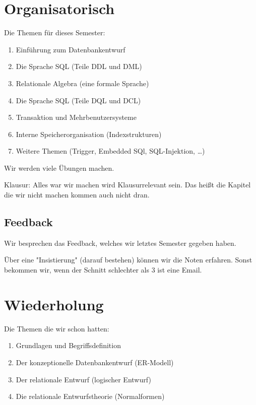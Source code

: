 \documentclass[a4paper]{article}
\title{\docTitle}
\author{Moritz}
\date{\today}
\begin{document}
\maketitle
\tableofcontents


\section{Organisatorisch}

Die Themen für dieses Semester:

\begin{enumerate}
    \item Einführung zum Datenbankentwurf
    \item Die Sprache SQL (Teile DDL und DML)
    \item Relationale Algebra (eine formale Sprache)
    \item Die Sprache SQL (Teile DQL und DCL)
    \item Transaktion und Mehrbenutzersysteme
    \item Interne Speicherorganisation (Indexstrukturen)
    \item Weitere Themen (Trigger, Embedded SQl, SQL-Injektion, \dots)
\end{enumerate}

Wir werden viele Übungen machen.

Klausur: Alles war wir machen wird Klausurrelevant sein. Das heißt die Kapitel die wir nicht machen kommen auch nicht dran.

\subsection{Feedback}

Wir besprechen das Feedback, welches wir letztes Semester gegeben haben.

Über eine "Insistierung" (darauf bestehen) können wir die Noten erfahren. Sonst bekommen wir, wenn der Schnitt schlechter als 3 ist eine Email.

\section{Wiederholung}

Die Themen die wir schon hatten:

\begin{enumerate}
    \item Grundlagen und Begriffsdefinition
    \item Der konzeptionelle Datenbankentwurf (ER-Modell)
    \item Der relationale Entwurf (logischer Entwurf)
    \item Die relationale Entwurfstheorie (Normalformen)
\end{enumerate}
\end{document}
